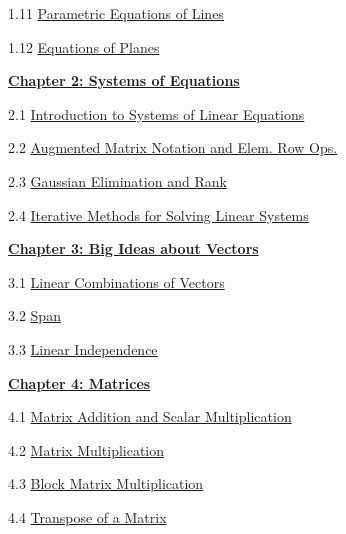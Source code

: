 \documentclass{ximera}
\begin{document}
1.11	\href{https://ximera.osu.edu/linearalgebradzv3/LinearAlgebraInteractiveIntro/RRN-0020/main}{Parametric Equations of Lines}
	
1.12	\href{https://ximera.osu.edu/linearalgebradzv3/LinearAlgebraInteractiveIntro/RRN-0030/main}{Equations of Planes}
	
\href{https://ximera.osu.edu/linearalgebradzv3/LinearAlgebraInteractiveIntro/XLAChapter_systems/main}{\textbf{Chapter 2: Systems of Equations}}
	
2.1	\href{https://ximera.osu.edu/linearalgebradzv3/LinearAlgebraInteractiveIntro/SYS-0020/main}{Introduction to Systems of Linear Equations}
	
2.2	\href{https://ximera.osu.edu/linearalgebradzv3/LinearAlgebraInteractiveIntro/SYS-0030/main}{Augmented Matrix Notation and Elem. Row Ops.}
	
2.3	\href{https://ximera.osu.edu/linearalgebradzv3/LinearAlgebraInteractiveIntro/SYS-0030/main}{Gaussian Elimination and Rank}
	
2.4	\href{https://ximera.osu.edu/linearalgebradzv3/LinearAlgebraInteractiveIntro/SYS-0040/main}{Iterative Methods for Solving Linear Systems}
	
\href{https://ximera.osu.edu/linearalgebradzv3/LinearAlgebraInteractiveIntro/XLAChapter_bigIdeas/main}{\textbf{Chapter 3: Big Ideas about Vectors}}
	
3.1	\href{https://ximera.osu.edu/linearalgebradzv3/LinearAlgebraInteractiveIntro/VEC-0040/main}{Linear Combinations of Vectors}
	
3.2	\href{https://ximera.osu.edu/linearalgebradzv3/LinearAlgebraInteractiveIntro/VEC-0090/main}{Span}
	
3.3	\href{https://ximera.osu.edu/linearalgebradzv3/LinearAlgebraInteractiveIntro/VEC-0100/main}{Linear Independence}
	
\href{https://ximera.osu.edu/linearalgebradzv3/LinearAlgebraInteractiveIntro/XLAChapter_matrices/main}{\textbf{Chapter 4: Matrices}}
	
4.1	\href{https://ximera.osu.edu/linearalgebradzv3/LinearAlgebraInteractiveIntro/MAT-0010/main}{Matrix Addition and Scalar Multiplication}
	
4.2	\href{https://ximera.osu.edu/linearalgebradzv3/LinearAlgebraInteractiveIntro/MAT-0020/main}{Matrix Multiplication}
	
4.3	\href{https://ximera.osu.edu/linearalgebradzv3/LinearAlgebraInteractiveIntro/MAT-0023/main}{Block Matrix Multiplication}
	
4.4	\href{https://ximera.osu.edu/linearalgebradzv3/LinearAlgebraInteractiveIntro/MAT-0025/main}{Transpose of a Matrix}
	
\end{document}
